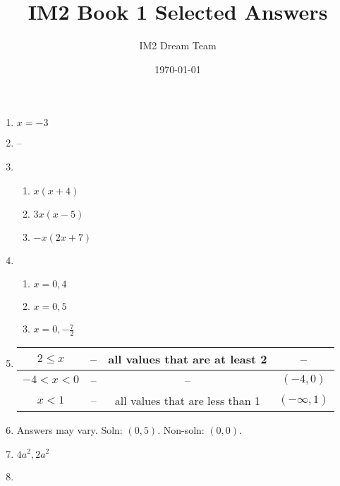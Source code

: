 \documentclass{article}
\title{IM2 Book 1 Selected Answers}
\author{IM2 Dream Team}
\date{\today}
\begin{document}
\maketitle

\begin{enumerate}

\item $x = -3$

\item --

\item

	\begin{enumerate}
	
	\item $x(x + 4)$
	
	\item $3x(x - 5)$
	
	\item $-x(2x + 7)$
	
	\end{enumerate}
	
\item

	\begin{enumerate}
	
	\item $x = 0, 4$
	
	\item $x = 0, 5$
	
	\item $x = 0, -\frac{7}{2}$
	
	\end{enumerate}
	
\item 

	\begin{tabular}{| c | c | c | c |}
	\hline
	$2 \leq x$ & -- & all values that are at least 2 & -- \\
	\hline
	$-4 < x < 0$ & -- & -- & $(-4, 0)$ \\
	\hline
	$x < 1$ & -- & all values that are less than 1 & $(-\infty, 1)$ \\
	\hline
	\end{tabular}
	
\item Answers may vary. Soln: $(0, 5)$. Non-soln: $(0, 0)$. 

\item $4a^2, 2a^2$

\item

	\begin{enumerate}
	

\end{enumerate}
\end{enumerate}
\end{document}
